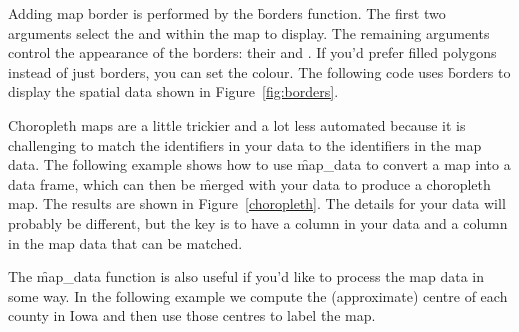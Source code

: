 Adding map border is performed by the \f{borders} function.  The first two arguments select the  and  within the map to display.  The remaining arguments control the appearance of the borders: their  and .  If you'd prefer filled polygons instead of just borders, you can set the  colour.  The following code uses \f{borders} to display the spatial data shown in Figure~\ref{fig:borders}.

% 
% 


Choropleth maps are a little trickier and a lot less automated because it is challenging to match the identifiers in your data to the identifiers in the map data. The following example shows how to use \f{map_data} to convert a map into a data frame, which can then be \f{merge}d with your data to produce a choropleth map. The results are shown in Figure~\ref{choropleth}. The details for your data will probably be different, but the key is to have a column in your data and a column in the map data that can be matched.

% 
% 


The \f{map_data} function is also useful if you'd like to process the map data in some way.  In the following example we compute the (approximate) centre of each county in Iowa and then use those centres to label the map.

